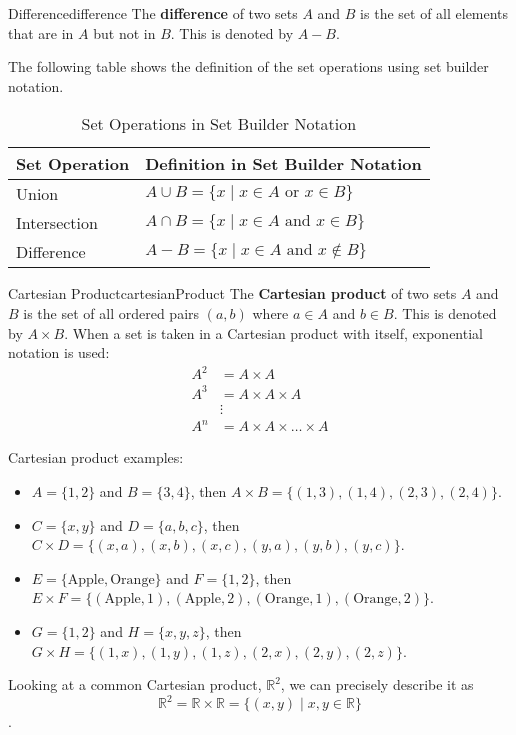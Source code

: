 \begin{definition}{Difference}{difference}
  The \textbf{difference} of two sets \( A \) and \( B \) is the set of all
  elements that are in \( A \) but not in \( B \). This is denoted by \( A - B \).
\end{definition}

The following table shows the definition of the set operations using set builder notation.
\begin{table}[H]
  \centering
  \begin{tabular}{p{1in} p{3in}}
    \toprule
    \textbf{Set Operation} & \textbf{Definition in Set Builder Notation} \\
    \midrule
    Union & \( A \cup B = \{ x \mid x \in A \text{ or } x \in B \} \) \\
    Intersection & \( A \cap B = \{ x \mid x \in A \text{ and } x \in B \} \) \\
    Difference & \( A - B = \{ x \mid x \in A \text{ and } x \notin B \} \) \\
    \bottomrule
  \end{tabular}
  \caption{Set Operations in Set Builder Notation}
\end{table}

\begin{definition}{Cartesian Product}{cartesianProduct}
  The \textbf{Cartesian product} of two sets \( A \) and \( B \) is the set of all
  ordered pairs \( (a, b) \) where \( a \in A \) and \( b \in B \). This is denoted by
  \( A \times B \).
  \medskip
  When a set is taken in a Cartesian product with itself, exponential notation is used:
  \begin{align*}
    A^2 &= A \times A \\
    A^3 &= A \times A \times A \\
    &\vdots \\
    A^n &= A \times A \times \ldots \times A
  \end{align*}
\end{definition}
Cartesian product examples:
\begin{itemize}
  \item \( A = \{ 1, 2 \} \) and \( B = \{ 3, 4 \} \), then
    \( A \times B = \{ (1, 3), (1, 4), (2, 3), (2, 4) \} \).
  \item \( C = \{ x, y \} \) and \( D = \{ a, b, c \} \),
    then \( C \times D = \{ (x, a), (x, b), (x, c), (y, a), (y, b), (y, c) \} \).
  \item \( E = \{ \text{Apple}, \text{Orange} \} \)
     and \( F = \{ 1, 2 \} \), then \\
     \( E \times F = \{ (\text{Apple}, 1), (\text{Apple}, 2), (\text{Orange}, 1), (\text{Orange}, 2) \} \).
  \item \( G = \{ 1, 2 \} \) and \( H = \{ x, y, z \} \), then \( G \times H = \{ (1, x), (1, y), (1, z), (2, x), (2, y), (2, z) \} \).
\end{itemize}

Looking at a common Cartesian product, \( \mathbb{R}^2 \), we can precisely describe it
as
\[
  \mathbb{R}^2 = \mathbb{R} \times \mathbb{R} = \{ (x, y) \mid x, y \in \mathbb{R} \}
\].
